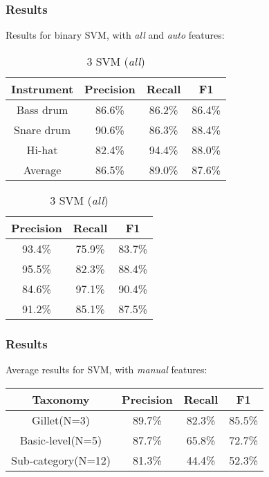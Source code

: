 \documentclass{beamer}
\begin{document}
    \begin{frame}
        \frametitle{Results}
        Results for binary SVM, with \emph{all} and \emph{auto} features:
                \begin{center}
                \footnotesize 
        \begin{table}
        \parbox{.50\linewidth}{       
        \caption{3 SVM (\emph{auto})}
        \begin{tabular}{|c|c|c|c|}
        \hline
        Instrument&Precision&Recall&F1\\
        \hline
        Bass drum&86.6\%&86.2\%&86.4\%\\
        \hline
        Snare drum&90.6\%&86.3\%&88.4\%\\
        \hline
        Hi-hat&82.4\%&94.4\%&88.0\%\\
        \hline
        Average&86.5\%&89.0\%&87.6\%\\
        \hline
        \end{tabular}
        }
        \hfill
        \parbox{.40\linewidth}{
        \caption{3 SVM (\emph{all})}
        \begin{tabular}{|c|c|c|}
        \hline
        Precision&Recall&F1\\
        \hline
        93.4\%&75.9\%&83.7\%\\
        \hline
        95.5\%&82.3\%&88.4\%\\
        \hline
        84.6\%&97.1\%&90.4\%\\
        \hline
        91.2\%&85.1\%&87.5\%\\
        \hline
        \end{tabular}
        }
        \end{table}
        \end{center}
    \end{frame}
    \begin{frame}
        \frametitle{Results}
        Average results for SVM, with \emph{manual} features:
        \begin{tabular}{|c|c|c|c|}
        \hline
        Taxonomy&Precision&Recall&F1\\
        \hline
        Gillet(N=3)&89.7\%&82.3\%&85.5\%\\
        \hline
        Basic-level(N=5)&87.7\%&65.8\%&72.7\%\\
        \hline
        Sub-category(N=12)&81.3\%&44.4\%&52.3\%\\
        \hline
        \end{tabular}
    \end{frame}
\end{document}
